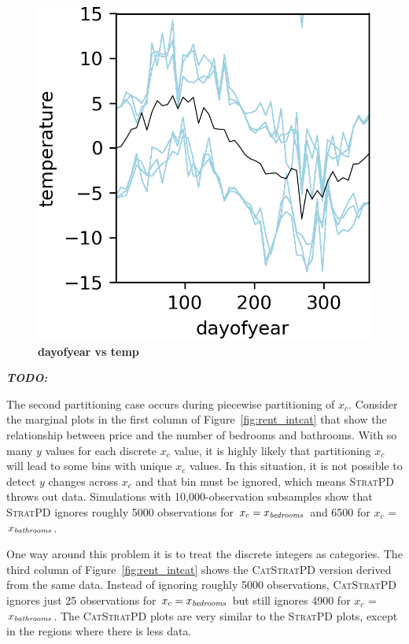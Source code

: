 \documentclass[12pt]{article}
\newcommand{\figref}[1]{Figure~\ref{#1}}
\newcommand{\todo}[1]{{\bf\em TODO:} {{\color{red}{#1}}}}
\newcommand{\spd}{\fontfamily{cmr}\textsc{\small StratPD}}
\newcommand{\cspd}{\fontfamily{cmr}\textsc{\small CatStratPD}}
\begin{document}
\begin{figure}[htbp]
\begin{center}
\includegraphics[scale=0.7]{images/dayofyear_vs_temp_pdp.png}
\caption{{\bf  dayofyear  vs temp}}
\label{fig:dayofyear_vs_temp}
\end{center}
\end{figure}

\todo{this has changed}

The second partitioning case occurs during piecewise partitioning of $x_c$. Consider the marginal plots in the first column of \figref{fig:rent_intcat} that show the relationship between price and the number of bedrooms and bathrooms. With so many $y$ values for each discrete $x_c$ value, it is highly likely that partitioning $x_c$ will lead to some bins with unique $x_c$ values. In this situation, it is not possible to detect $y$ changes across $x_c$ and that bin must be ignored, which means \spd{} throws out data.  Simulations with 10,000-observation subsamples show that \spd{} ignores roughly 5000 observations for $x_c = x_{\it bedrooms}$ and 6500 for $x_c$ = $x_{\it bathrooms}$. 

One way around this problem it is to treat the discrete integers as categories. The third column of \figref{fig:rent_intcat} shows the \cspd{} version derived from the same data. Instead of ignoring roughly 5000 observations, \cspd{} ignores just 25 observations for $x_c = x_{\it bedrooms}$ but still ignores 4900 for $x_c$ = $x_{\it bathrooms}$. The \cspd{} plots are very similar to the \spd{} plots, except in the regions where there is less data.
\end{document}
